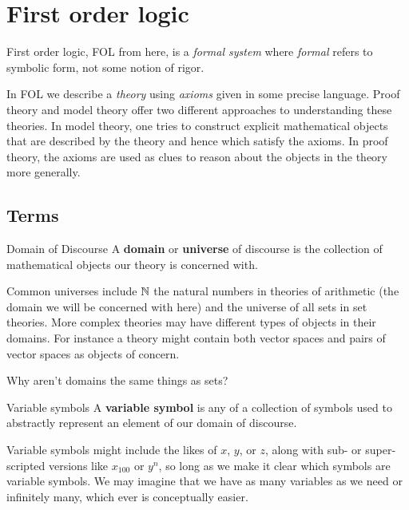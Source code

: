 \section{First order logic}


First order logic, FOL from here, is a \emph{formal system} where \emph{formal} refers to symbolic form, not some notion of rigor.

In FOL we describe a \emph{theory} using \emph{axioms} given in some precise language. Proof theory and model theory offer two different approaches to understanding these theories. In model theory, one tries to construct explicit mathematical objects that are described by the theory and hence which satisfy the axioms. In proof theory, the axioms are used as clues to reason about the objects in the theory more generally. 


\subsection{Terms}

\begin{definition}{Domain of Discourse}{}
	A {\bf domain} or {\bf universe} of discourse is the collection of mathematical objects our theory is concerned with.
\end{definition}

\noindent
Common universes include $\mathbb{N}$ the natural numbers in theories of arithmetic (the domain we will be concerned with here) and the universe of all sets in set theories.
More complex theories may have different types of objects in their domains.
For instance a theory might contain both vector spaces and pairs of vector spaces as objects of concern.

\begin{tcolorbox}[colback=red!5!white,colframe=red!75!black,title={\bf Hope someone asks about it}]
	Why aren't domains the same things as sets?
\end{tcolorbox}


\begin{definition}{Variable symbols}{}
	A {\bf variable symbol} is any of a collection of symbols used to abstractly represent an element of our domain of discourse.
\end{definition}

\noindent 
Variable symbols might include the likes of $x$, $y$, or $z$, along with sub- or super-scripted versions like $x_{100}$ or $y^n$, so long as we make it clear which symbols are variable symbols.
We may imagine that we have as many variables as we need or infinitely many, which ever is conceptually easier.

